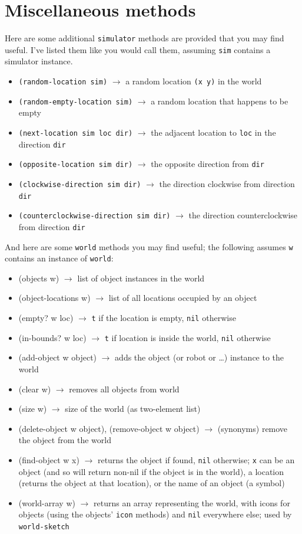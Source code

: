 \documentclass[11pt]{tufte-handout}
\begin{document}
\section{Miscellaneous methods}
\label{sec:orgd6e1fb1}

Here are some additional \texttt{simulator} methods are provided that you may find useful.  I've listed them like you would call them, assuming \texttt{sim} contains a simulator instance.

\begin{itemize}
\item \texttt{(random-location sim)} \(\to\) a random location \texttt{(x y)} in the world
\item \texttt{(random-empty-location sim)} \(\to\) a random location that happens to be empty
\item \texttt{(next-location sim loc dir)} \(\to\) the adjacent location to \texttt{loc} in the direction \texttt{dir}
\item \texttt{(opposite-location sim dir)} \(\to\)  the opposite direction from \texttt{dir}
\item \texttt{(clockwise-direction sim dir)} \(\to\) the direction clockwise from  direction \texttt{dir}
\item \texttt{(counterclockwise-direction sim dir)} \(\to\) the direction counterclockwise from  direction \texttt{dir}
\end{itemize}

And here are some \texttt{world} methods you may find useful; the following assumes \texttt{w} contains an instance of \texttt{world}:
\begin{itemize}
\item (objects w) \(\to\) list of object instances in the world
\item (object-locations w) \(\to\) list of all locations occupied by an object
\item (empty? w loc) \(\to\) \texttt{t} if the location is empty, \texttt{nil} otherwise
\item (in-bounds? w loc) \(\to\) \texttt{t} if location is inside the world, \texttt{nil} otherwise
\item (add-object w object) \(\to\) adds the object (or robot or \ldots{}) instance to the world
\item (clear w) \(\to\) removes all objects from world
\item (size w) \(\to\) size of the world (as two-element list)
\item (delete-object w object), (remove-object w object) \(\to\) (synonyms) remove the object from the world
\item (find-object w x) \(\to\) returns the object if found, \texttt{nil} otherwise; \texttt{x} can be an object (and so will return non-nil if the object is in the world), a location (returns the object at that location), or the name of an object (a symbol)
\item (world-array w) \(\to\) returns an array representing the world, with icons for objects (using the objects'  \texttt{icon} methods) and \texttt{nil} everywhere else; used by \texttt{world-sketch}
\end{itemize}
\end{document}
